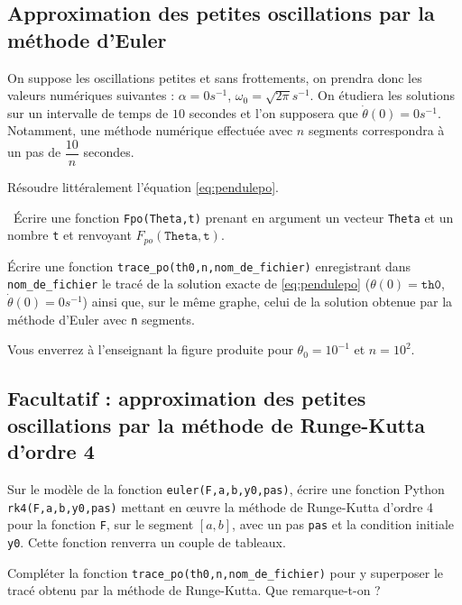 \subsection{Approximation des petites oscillations par la méthode d'Euler}

On suppose les oscillations petites et sans frottements, on prendra donc les valeurs numériques suivantes : $\alpha = 0 s^{-1}$, $\omega_0 = \sqrt{2\pi} s^{-1}$. 
On étudiera les solutions sur un intervalle de temps de $10$ secondes et l'on supposera que $\dot{\theta}(0) = 0s^{-1}$. 
Notamment, une méthode numérique effectuée avec $n$ segments correspondra à un pas de $\dfrac{10}{n}$ secondes. 

\question{} Résoudre littéralement l'équation \eqref{eq:pendulepo}.

\medskip

\question\ \'Ecrire une fonction \texttt{Fpo(Theta,t)} prenant en argument un vecteur \texttt{Theta} et un nombre \texttt{t} et renvoyant $F_{po}(\texttt{Theta},\texttt{t})$.

\medskip

\question{\label{qu:tracepo}} \'Ecrire une fonction \texttt{trace\_po(th0,n,nom\_de\_fichier)} enregistrant dans \texttt{nom\_de\_fichier} le tracé de la solution exacte de \eqref{eq:pendulepo} ($\theta(0) = \texttt{th0}$, $\dot{\theta}(0) = 0s^{-1}$) ainsi que, sur le même graphe, celui de la solution obtenue par la méthode d'Euler avec \texttt{n} segments.  

Vous enverrez à l'enseignant la figure produite pour $\theta_0 = 10^{-1}$ et $n=10^2$. 

\subsection{Facultatif : approximation des petites oscillations par la méthode de Runge-Kutta d'ordre 4}

\question{} Sur le modèle de la fonction \texttt{euler(F,a,b,y0,pas)}, écrire une fonction Python \texttt{rk4(F,a,b,y0,pas)} mettant en {\oe}uvre la méthode de Runge-Kutta d'ordre 4 pour la fonction \texttt{F}, sur le segment $[a,b]$, avec un pas \texttt{pas} et la condition initiale \texttt{y0}. 
  Cette fonction renverra un couple de tableaux. 
  
\medskip
  
\question{} Compléter la fonction \texttt{trace\_po(th0,n,nom\_de\_fichier)} pour y superposer le tracé obtenu par la méthode de Runge-Kutta.  Que remarque-t-on ?

